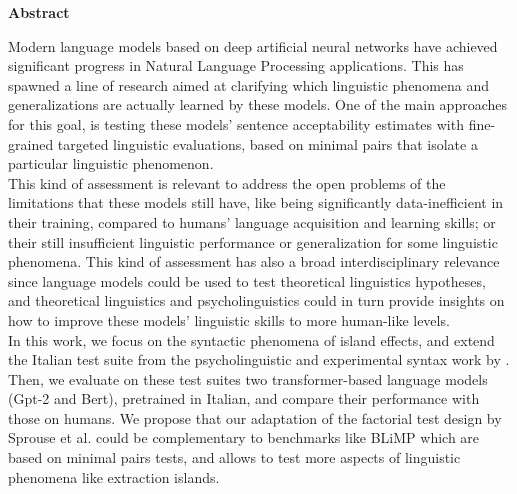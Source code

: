 \thispagestyle{plain}
\begin{center}
	\Large
	\vspace{1.8cm}
    \textbf{Abstract}
    	\vspace{0.9cm}
\end{center}

\normalsize
Modern language models based on deep artificial neural networks have achieved significant progress in Natural Language Processing applications. This has spawned a line of research aimed at clarifying which linguistic phenomena and generalizations are actually learned by these models. One of the main approaches for this goal, is testing these models' sentence acceptability estimates with fine-grained targeted linguistic evaluations, based on minimal pairs that isolate a particular linguistic phenomenon.\\

This kind of assessment is relevant to address the open problems of the limitations that these models still have, like being significantly data-inefficient in their training, compared to humans’ language acquisition and learning skills; or their still insufficient linguistic performance or generalization for some linguistic phenomena. This kind of assessment has also a broad interdisciplinary relevance since language models could be used to test theoretical linguistics hypotheses, and theoretical linguistics and psycholinguistics could in turn provide insights on how to improve these models' linguistic skills to more human-like levels.\\ 

In this work, we focus on the syntactic phenomena of island effects, and extend the Italian test suite from the psycholinguistic and experimental syntax work by \citet{sprouse2016experimental}. Then,  we evaluate on these test suites two transformer-based language models (Gpt-2 and Bert), pretrained in Italian, and compare their performance with those on humans. We propose that our adaptation of the factorial test design by Sprouse et al. could be complementary to benchmarks like BLiMP \citep{warstadt2020blimp} which are based on minimal pairs tests, and allows to test more aspects of linguistic phenomena like extraction islands.

